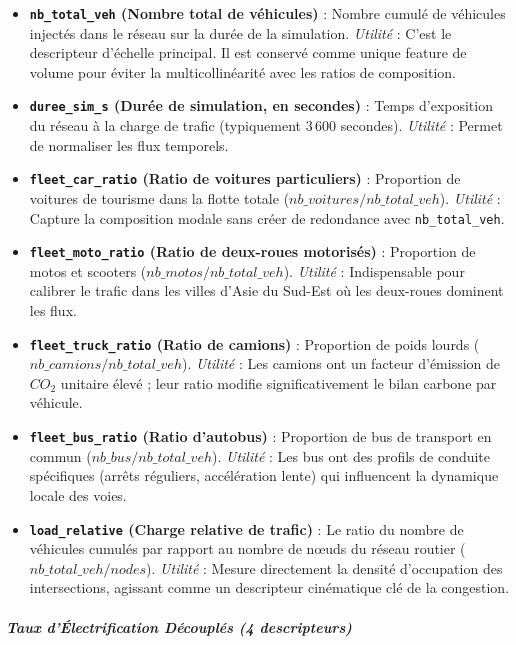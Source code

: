 \documentclass[10pt, a4paper]{article}
\providecommand{\tightlist}{}
\begin{document}
\begin{itemize}
\tightlist
\item
  \textbf{\texttt{nb\_total\_veh} (Nombre total de véhicules)} : Nombre
  cumulé de véhicules injectés dans le réseau sur la durée de la
  simulation. \emph{Utilité} : C'est le descripteur d'échelle principal.
  Il est conservé comme unique feature de volume pour éviter la
  multicollinéarité avec les ratios de composition.
\item
  \textbf{\texttt{duree\_sim\_s} (Durée de simulation, en secondes)} :
  Temps d'exposition du réseau à la charge de trafic (typiquement 3\,600
  secondes). \emph{Utilité} : Permet de normaliser les flux temporels.
\item
  \textbf{\texttt{fleet\_car\_ratio} (Ratio de voitures particuliers)} :
  Proportion de voitures de tourisme dans la flotte totale
  (\(nb\_voitures / nb\_total\_veh\)). \emph{Utilité} : Capture la
  composition modale sans créer de redondance avec
  \texttt{nb\_total\_veh}.
\item
  \textbf{\texttt{fleet\_moto\_ratio} (Ratio de deux-roues motorisés)} :
  Proportion de motos et scooters (\(nb\_motos / nb\_total\_veh\)).
  \emph{Utilité} : Indispensable pour calibrer le trafic dans les villes
  d'Asie du Sud-Est où les deux-roues dominent les flux.
\item
  \textbf{\texttt{fleet\_truck\_ratio} (Ratio de camions)} : Proportion
  de poids lourds (\(nb\_camions / nb\_total\_veh\)). \emph{Utilité} :
  Les camions ont un facteur d'émission de \(CO_2\) unitaire élevé ;
  leur ratio modifie significativement le bilan carbone par véhicule.
\item
  \textbf{\texttt{fleet\_bus\_ratio} (Ratio d'autobus)} : Proportion de
  bus de transport en commun (\(nb\_bus / nb\_total\_veh\)).
  \emph{Utilité} : Les bus ont des profils de conduite spécifiques
  (arrêts réguliers, accélération lente) qui influencent la dynamique
  locale des voies.
\item
  \textbf{\texttt{load\_relative} (Charge relative de trafic)} : Le
  ratio du nombre de véhicules cumulés par rapport au nombre de nœuds du
  réseau routier (\(nb\_total\_veh / nodes\)). \emph{Utilité} : Mesure
  directement la densité d'occupation des intersections, agissant comme
  un descripteur cinématique clé de la congestion.
\end{itemize}

\subparagraph{Taux d'Électrification Découplés (4
descripteurs)}\label{taux-duxe9lectrification-duxe9coupluxe9s-4-descripteurs}
\end{document}

